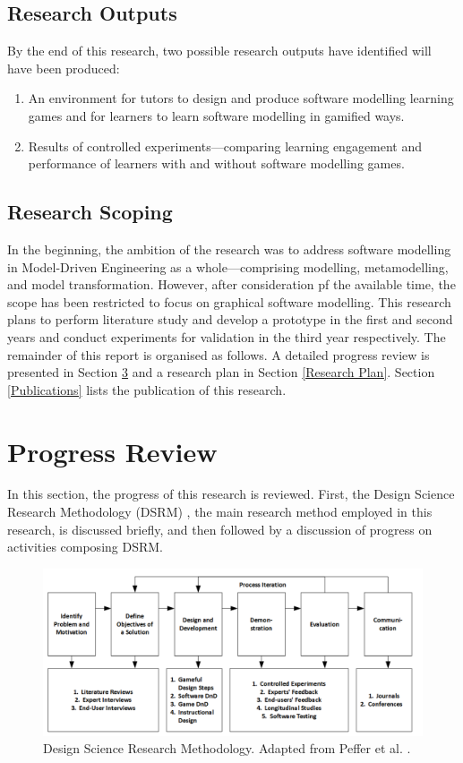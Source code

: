 \documentclass[12pt, a4paper]{report} \usepackage[titletoc]{appendix}
\begin{document}
\section{Research Outputs}
By the end of this research, two possible research outputs have identified will have been produced:
\begin{enumerate}
\item An environment for tutors to design and produce software modelling learning games and for learners to learn software modelling in gamified ways. 
\item Results of controlled experiments---comparing learning engagement and performance of learners with and without software modelling games.
\end{enumerate}

\section{Research Scoping}
In the beginning, the ambition of the research was to address software modelling in Model-Driven Engineering as a whole---comprising modelling, metamodelling, and model transformation. However, after consideration pf the available time, the scope has been restricted to focus on graphical software modelling. This research plans to perform literature study and develop a prototype in the first and second years and conduct experiments for validation in the third year respectively.\newline\newline
The remainder of this report is organised as follows. A detailed
progress review is presented in Section \ref{Progres Review} and a research plan in Section \ref{Research Plan}. Section \ref{Publications} lists the publication of this research.

\chapter{Progress Review}
\label{Progres Review}
In this section, the progress of this research is reviewed. First, the Design Science Research Methodology (DSRM) \cite{peffers2007design}, the main research method employed in this research, is discussed briefly, and then followed by a discussion of progress on activities composing DSRM.

\begin{figure}[th] \centering \includegraphics[width=\textwidth]{dsrm}
\caption{Design Science Research Methodology. Adapted from Peffer et al. \cite{peffers2007design}.}
\label{dsrm}
\end{figure}
\end{document}
